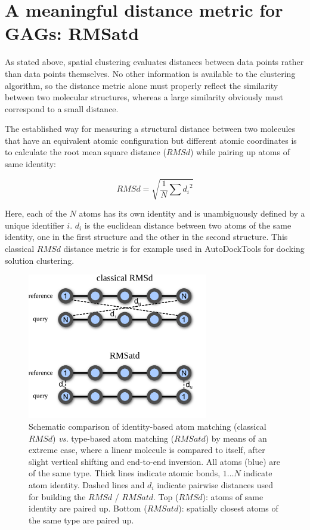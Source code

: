 \section{A meaningful distance metric for GAGs: RMSatd}

As stated above, spatial clustering evaluates distances between data points
rather than data points themselves. No other information is available to the
clustering algorithm, so the distance metric alone must properly reflect the
similarity between two molecular structures, whereas a large similarity
obviously must correspond to a small distance.

The established way for measuring a structural distance between two molecules
that have an equivalent atomic configuration but different atomic coordinates is
to calculate the root mean square distance ($RMSd$) while pairing up atoms of
same identity:

\begin{equation}
RMSd = \sqrt{\frac{1}{N}\sum{{d_i}^2}}
\end{equation}

Here, each of the $N$ atoms has its own identity and is unambiguously defined by
a unique identifier $i$. $d_i$ is the euclidean distance between two atoms of
the same identity, one in the first structure and the other in the second
structure. This classical $RMSd$ distance metric is for example used in
AutoDockTools \cite{autodock4_adt_2009} for docking solution clustering.

\begin{figure}
\centering
\includegraphics[width=0.7\textwidth]{gfx/clust/RMSd_vs_RMSatd_scheme_03.png}
\caption[]{
Schematic comparison of identity-based atom matching (classical $RMSd$)
\textit{vs.} type-based atom matching ($RMSatd$) by means of an extreme case,
where a linear molecule is compared to itself, after slight vertical shifting
and end-to-end inversion. All atoms (blue) are of the same type. Thick lines
indicate atomic bonds, $1 \dots N$ indicate atom identity. Dashed lines and
$d_i$ indicate pairwise distances used for building the $RMSd$ / $RMSatd$. Top
($RMSd$): atoms of same identity are paired up. Bottom ($RMSatd$): spatially
closest atoms of the same type are paired up.
}
\label{fig:clust:rmsd_vs_rmsatd}
\end{figure}

